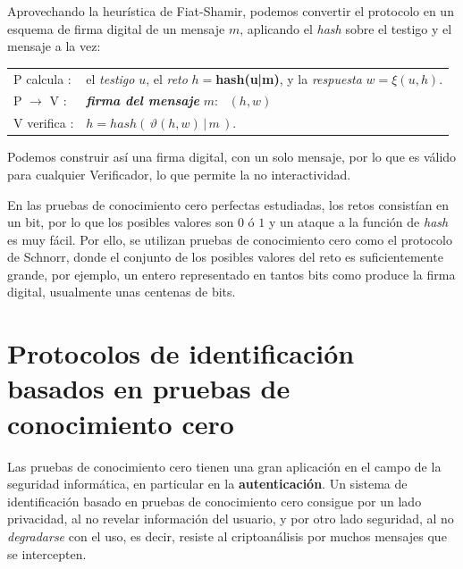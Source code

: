 Aprovechando la heurística de Fiat-Shamir, podemos convertir el protocolo en un esquema de firma digital de un mensaje $m$, aplicando el \textit{hash} sobre el testigo y el mensaje a la vez:


\begin{center}
	\begin{tabular}{ll}\label{fiat-shamir-heur}
		P calcula :& el \textit{testigo} $u$, el \textit{reto} $h=$\textbf{hash(u|m)}, y la \textit{respuesta} $w = \xi(u, h)$.
		\\
		P $\rightarrow$ V :& \textit{\textbf{firma del mensaje}} $m$: \, $(h,w)$
		\\
		V verifica :& $h=hash(\,\vartheta(h,w)\,|\,m\,)$.
	\end{tabular}
\end{center}

Podemos construir así una firma digital, con un solo mensaje, por lo que es válido para cualquier Verificador, lo que permite la no interactividad. 

\hfil


\begin{remark}
	\hfil
	
	En las pruebas de conocimiento cero perfectas estudiadas, los retos consistían en un bit, por lo que los posibles valores son $0$ ó $1$ y un ataque a la función de \textit{hash} es muy fácil. Por ello, se utilizan pruebas de conocimiento cero como el protocolo de Schnorr, donde el conjunto de los posibles valores del reto es suficientemente grande, por ejemplo, un entero representado en tantos bits como produce la firma digital, usualmente unas centenas de bits.	
\end{remark}








\section{Protocolos de identificación basados en pruebas de conocimiento cero}


Las pruebas de conocimiento cero tienen una gran aplicación en el campo de la seguridad informática, en particular en la \textbf{autenticación}. Un sistema de identificación basado en pruebas de conocimiento cero consigue por un lado privacidad, al no revelar información del usuario, y por otro lado seguridad, al no \textit{degradarse} con el uso, es decir, resiste al criptoanálisis por muchos mensajes que se intercepten. 

